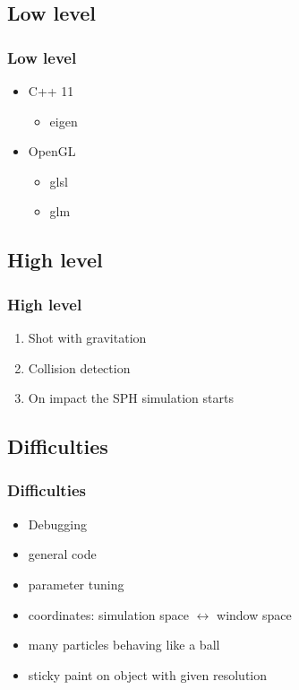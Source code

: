 \subsection{Low level}
\begin{frame}
	\frametitle{Low level}
	\begin{itemize}
		\item C++ 11
			\begin{itemize}
				\item eigen
			\end{itemize}
		\item OpenGL
			\begin{itemize}
				\item glsl
				\item glm
			\end{itemize}
	\end{itemize}
\end{frame}
\subsection{High level}
\begin{frame}
	\frametitle{High level}
	\begin{enumerate}
		\item Shot with gravitation
		\item Collision detection
		\item On impact the SPH simulation starts
	\end{enumerate}
\end{frame}
\subsection{Difficulties}
\begin{frame}
	\frametitle{Difficulties}
	\begin{itemize}
		\item Debugging
		\item general code
		\item parameter tuning
		\item coordinates: simulation space $\leftrightarrow$ window space
		\item many particles behaving like a ball
		\item sticky paint on object with given resolution
	\end{itemize}
\end{frame}
